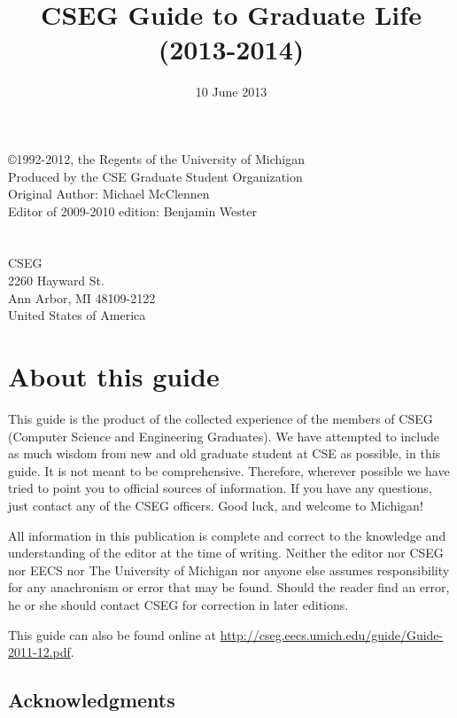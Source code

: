 \documentclass[11pt]{article}
\title{CSEG Guide to Graduate Life (2013-2014)}
\author{}
\date{10 June 2013}
\begin{document}
\maketitle

\setcounter{tocdepth}{3}
\tableofcontents
\vspace*{1cm}

\newpage
 \null\vfill
 \noindent
 \copyright 1992-2012, the Regents of the University of Michigan\\
 Produced by the CSE Graduate Student Organization\\
 Original Author: Michael McClennen\\
 Editor of 2009-2010 edition: Benjamin Wester\\
  \\
\\
CSEG\\
2260 Hayward St.\\
Ann Arbor, MI 48109-2122\\
United States of America

\newpage



\section{About this guide}
\label{sec-1}

This guide is the product of the collected experience of the members
of CSEG (Computer Science and Engineering Graduates).  We have
attempted to include as much wisdom from new and old graduate student at
CSE as possible, in this guide. It is not meant to be comprehensive.
Therefore, wherever possible we have tried to point you to official sources of
information.  If you have any questions, just contact any of the CSEG
officers.  Good luck, and welcome to Michigan!

All information in this publication is complete and correct to the
knowledge and understanding of the editor at the time of writing.
Neither the editor nor CSEG nor EECS nor The University of Michigan
nor anyone else assumes responsibility for any anachronism or error
that may be found.  Should the reader find an error, he or she should
contact CSEG for correction in later editions.

This guide can also be found online at
\href{http://cseg.eecs.umich.edu/guide/Guide-2011-12.pdf}{http://cseg.eecs.umich.edu/guide/Guide-2011-12.pdf}.
\subsection{Acknowledgments}
\label{sec-1_1}
\end{document}
